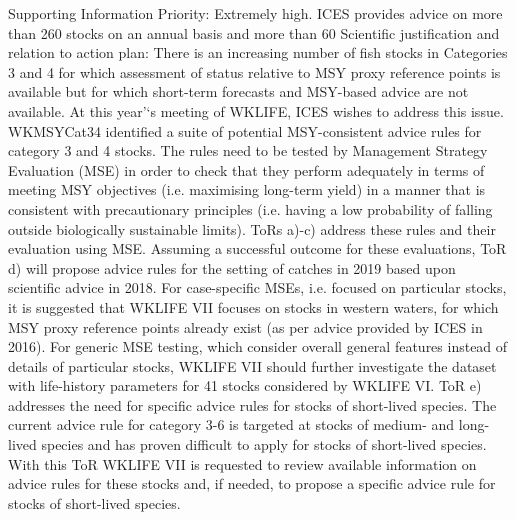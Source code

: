 \documentclass[a4paper,10pt]{article}
\begin{document}
Supporting Information 
Priority:
Extremely high. ICES provides advice on more than 260 stocks on an annual basis and more than 60%
Scientific justification and relation to action plan:
There is an increasing number of fish stocks in Categories 3 and 4 for which assessment of status relative to MSY proxy reference points is available but for which short-term forecasts and MSY-based advice are not available.  At this year’‘s meeting of WKLIFE, ICES wishes to address this issue.
WKMSYCat34 identified a suite of potential MSY-consistent advice rules for category 3 and 4 stocks. The rules need to be tested by Management Strategy Evaluation (MSE) in order to check that they perform adequately in terms of meeting MSY objectives (i.e. maximising long-term yield) in a manner that is consistent with precautionary principles (i.e. having a low probability of falling outside biologically sustainable limits).
ToRs a)-c) address these rules and their evaluation using MSE.  Assuming a successful outcome for these evaluations, 
ToR d) will propose advice rules for the setting of catches in 2019 based upon scientific advice in 2018.
For case-specific MSEs, i.e. focused on particular stocks, it is suggested that WKLIFE VII focuses on stocks in western waters, for which MSY proxy reference points already exist (as per advice provided by ICES in 2016).  For generic MSE testing, which consider overall general features instead of details of particular stocks, WKLIFE VII should further investigate the dataset with life-history parameters for 41 stocks considered by WKLIFE VI.
ToR e) addresses the need for specific advice rules for stocks of short-lived species. The current advice rule for category 3-6 is targeted at stocks of medium- and long-lived species and has proven difficult to apply for stocks of short-lived species. With this ToR WKLIFE VII is requested to review available information on advice rules for these stocks and, if needed, to propose a specific advice rule for stocks of short-lived species.
\end{document}
